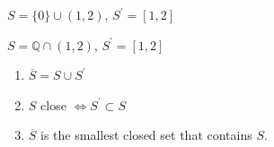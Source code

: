 \begin{example}
    $S = \{ 0 \}  \cup (1, 2)$, $S^{\prime} = [1, 2]$
\end{example}

\begin{example}
    $S = \mathbb{Q} \cap (1, 2)$, $S^{\prime} = [1, 2]$
\end{example}

\begin{proposition}\label{prop:closure-acc}
    \hfill
    \begin{enumerate}[ref=\theproposition.\arabic*]
        \item $\overline{S} = S \cup S^{\prime}$
        \item $S$ close $\iff S^{\prime} \subset S$
        \item $\overline{S}$ is the smallest closed set that contains $S$.
    \end{enumerate}
\end{proposition}

